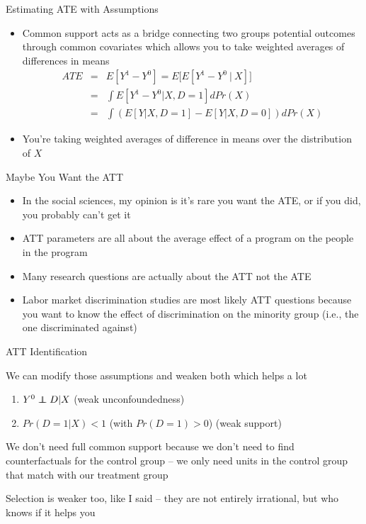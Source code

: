 \documentclass{beamer}
\newcommand\independent{\protect\mathpalette{\protect\independenT}{\perp}}
\def\independenT#1#2{\mathrel{\rlap{$#1#2$}\mkern2mu{#1#2}}}
\begin{document}
\begin{frame}{Estimating ATE with Assumptions}


	\begin{itemize}
	\item Common support acts as a bridge connecting two groups potential outcomes through common covariates which allows you to take weighted averages of differences in means
		\begin{eqnarray*}
		ATE &=&E[Y^1-Y^0] = E\bigg[ E[Y^1 - Y^0 \ \vert \ X] \bigg] \\
		&=& \int E[Y^1 - Y^0 |X,D=1] dPr(X) \\
		&=& \int \left(E[Y|X,D=1] - E[Y|X,D=0]\right)dPr(X)
		\end{eqnarray*}
	\item You're taking weighted averages of difference in means over the distribution of $X$
	\end{itemize}

\end{frame}




\begin{frame}{Maybe You Want the ATT}

\begin{itemize}
\item In the social sciences, my opinion is it's rare you want the ATE, or if you did, you probably can't get it
\item ATT parameters are all about the average effect of a program on the people in the program
\item Many research questions are actually about the ATT not the ATE 
\item Labor market discrimination studies are most likely ATT questions because you want to know the effect of discrimination on the minority group (i.e., the one discriminated against)
\end{itemize}

\end{frame}




\begin{frame}{ATT Identification}

We can modify those assumptions and weaken both which helps a lot

\begin{enumerate}
  \item $Y^0 \independent{D} | X$ (weak unconfoundedness)
  \item $Pr(D=1|X)<1$ (with $Pr(D=1)>0$) (weak support)
\end{enumerate}

\bigskip

We don't need full common support because we don't need to find counterfactuals for the control group -- we only need units in the control group that match with our treatment group

\bigskip

Selection is weaker too, like I said -- they are not entirely irrational, but who knows if it helps you

\end{frame}
\end{document}
